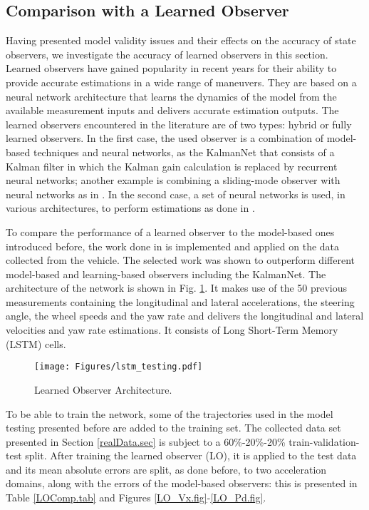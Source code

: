 \documentclass[journal]{IEEEtran}
\begin{document}
\subsection{Comparison with a Learned Observer}\label{EKF_learned.ssec}
Having presented model validity issues and their effects on the accuracy of state observers, we investigate the accuracy of learned observers in this section. Learned observers have gained popularity in recent years for their ability to provide accurate estimations in a wide range of maneuvers. They are based on a neural network architecture that learns the dynamics of the model from the available measurement inputs and delivers accurate estimation outputs. The learned observers encountered in the literature are of two types: hybrid or fully learned observers. In the first case, the used observer is a combination of model-based techniques and neural networks, as the KalmanNet \cite{revach_kalmannet_2021,escoriza_data-driven_2021} that consists of a Kalman filter in which the Kalman gain calculation is replaced by recurrent neural networks; another example is combining a sliding-mode observer with neural networks as in \cite{song_vehicle_2021}. In the second case, a set of neural networks is used, in various architectures, to perform estimations as done in \cite{srinivasan_end--end_2020, zhang_reliable_2021, ghosn_robust_2023}. 

To compare the performance of a learned observer to the model-based ones introduced before, the work done in \cite{ghosn_robust_2023} is implemented and applied on the data collected from the vehicle. The selected work was shown to outperform different model-based and learning-based observers including the KalmanNet. The architecture of the network is shown in Fig. \ref{arch.fig}. It makes use of the 50 previous measurements containing the longitudinal and lateral accelerations, the steering angle, the wheel speeds and the yaw rate and delivers the longitudinal and lateral velocities and yaw rate estimations. It consists of Long Short-Term Memory (LSTM) cells. 


\begin{figure}[h]
    \centering
    \texttt{[image: Figures/lstm\_testing.pdf]}
    \caption{Learned Observer Architecture.}
    \label{arch.fig}
\end{figure}

To be able to train the network, some of the trajectories used in the model testing presented before are added to the training set. The collected data set presented in Section \ref{realData.sec} is subject to a 60\%-20\%-20\% train-validation-test split.  After training the learned observer (LO), it is applied to the test data and its mean absolute errors are split, as done before, to two acceleration domains, along with the errors of the model-based observers: this is presented in Table \ref{LOComp.tab} and Figures \ref{LO_Vx.fig}-\ref{LO_Pd.fig}.   
\end{document}
